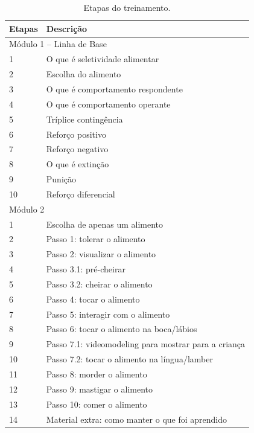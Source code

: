 \documentclass[portuguese]{textolivre}
\begin{document}
\begin{table}[h!]
\begin{threeparttable}
\caption{Etapas do treinamento.}
\label{tab1}
\begin{tabular}{p{2cm}p{11cm}}
\toprule
Etapas & Descrição \\
\midrule

\multicolumn{2}{l}{Módulo 1 -- Linha de Base} \\
\hline
1 & O que é seletividade alimentar \\
2 & Escolha do alimento \\
3 & O que é comportamento respondente \\
4 & O que é comportamento operante \\
5 & Tríplice contingência \\
6 & Reforço positivo \\
7 & Reforço negativo \\
8 & O que é extinção \\
9 & Punição \\
10 & Reforço diferencial \\
\midrule

\multicolumn{2}{l}{Módulo 2} \\
\midrule
1 & Escolha de apenas um alimento \\
2 & Passo 1: tolerar o alimento \\
3 & Passo 2: visualizar o alimento \\
4 & Passo 3.1: pré-cheirar \\
5 & Passo 3.2: cheirar o alimento \\
6 & Passo 4: tocar o alimento \\
7 & Passo 5: interagir com o alimento \\
8 & Passo 6: tocar o alimento na boca/lábios \\
9 & Passo 7.1: videomodeling para mostrar para a criança \\
10 & Passo 7.2: tocar o alimento na língua/lamber \\
11 & Passo 8: morder o alimento \\
12 & Passo 9: mastigar o alimento \\
13 & Passo 10: comer o alimento \\
14 & Material extra: como manter o que foi aprendido \\
\bottomrule

\end{tabular}

\vspace{0.3cm}
\end{threeparttable}
\end{table}
\end{document}
